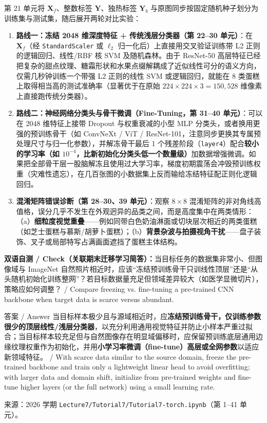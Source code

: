 第 21 单元将 $\mathbf{X}_f$、整数标签 $\mathbf{Y}$、独热标签 $\mathbf{Y}_b$ 与原图同步按固定随机种子划分为训练集与测试集，随后展开两轮对比实验：
\begin{enumerate}
\item \textbf{路线一：冻结 2048 维深度特征 + 传统浅层分类器（第 22–30 单元）}：在 $\mathbf{X}_f$（经 \texttt{StandardScaler} 或 $\ell_2$ 归一化后）上直接用交叉验证训练带 L2 正则的逻辑回归、线性/RBF 核 SVM 及随机森林。由于 ResNet-50 高层特征已经把复杂的甜点纹理、糖霜形状和水果点缀解耦成了近似线性可分的语义方向，仅需几秒钟训练一个带强 L2 正则的线性 SVM 或逻辑回归，就能在 8 类蛋糕上取得相当高的测试准确率（显著优于在原始 $224\times 224\times 3 = 150{,}528$ 维像素上直接跑传统分类器）。
\item \textbf{路线二：神经网络分类头与骨干微调（Fine-Tuning，第 31–40 单元）}：可以在 $2048$ 维特征上接带 Dropout 与权重衰减的小型 MLP 分类头，或者换用更强的预训练骨干（如 ConvNeXt / ViT / ResNet-101，注意同步更换其专属预处理尺寸与归一化参数），并解冻骨干最后 1 个残差阶段（\texttt{layer4}）配合\textbf{较小的学习率（如 $10^{-4}$，比新初始化分类头低一个数量级）}加数据增强微调。如果把全部骨干层一股脑解冻且使用过大学习率，梯度初期震荡会冲毁预训练权重（灾难性遗忘），在几百张图的小数据集上反而输给冻结特征配正则化逻辑回归。
\item \textbf{混淆矩阵错误诊断（第 28–30、39 单元）}：观察 $8\times 8$ 混淆矩阵的非对角线高值格，误分几乎不发生在外观迥异的品类之间，而是高度集中在两类情形：（a）\textbf{细粒度视觉重叠}——例如同带白色奶油淋面或切块层次相近的两类蛋糕（如芝士蛋糕与慕斯/胡萝卜蛋糕）；（b）\textbf{背景杂波与拍摄视角干扰}——盘子装饰、叉子或局部特写占满画面遮挡了蛋糕主体结构。
\end{enumerate}

\textbf{双语自测 / Check（关联期末迁移学习简答）：}当目标任务的数据集非常小、但图像域与 ImageNet 自然照片相近时，应该“冻结预训练骨干只训线性顶层”还是“从头随机初始化训练整网”？若目标数据量充足但领域差异较大（如医学显微切片），策略应如何调整？ / Compare freezing vs. fine-tuning a pre-trained CNN backbone when target data is scarce versus abundant.

\begin{StudySolution}{答案 / Answer}
当目标样本极少且与源域相近时，应\textbf{冻结预训练骨干，仅训练参数很少的顶层线性/浅层分类器}，以充分利用通用视觉特征并防止小样本严重过拟合；当目标样本较充足但与自然图像存在明显域偏移时，应保留预训练底层通用边缘纹理权重作为初始化，并用\textbf{小学习率微调（fine-tune）高层或全网参数}以适应新领域特征。 / With scarce data similar to the source domain, freeze the pre-trained backbone and train only a lightweight linear head to avoid overfitting; with larger data and domain shift, initialize from pre-trained weights and fine-tune higher layers (or the full network) using a small learning rate.
\end{StudySolution}

来源：2026 学期 \texttt{Lecture7/Tutorial7/Tutorial7-torch.ipynb}（第 1–41 单元）。

